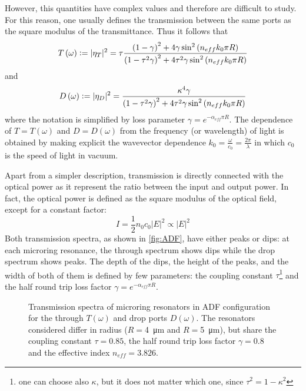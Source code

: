 However, this quantities have complex values and therefore are difficult to study.
For this reason, one usually defines the transmission between the same ports as the square modulus of the transmittance.
Thus it follows that
\begin{equation}
T \left( \omega \right) \vcentcolon= |\eta_T|^2 = \tau 
\dfrac	{ \left( 1- 				\gamma \right)^2 + 4 				\gamma \sin^2 \left( n_{eff} k_0 \pi R \right) }
			{ \left( 1-\tau^2	\gamma \right)^2 + 4 \tau^2	\gamma \sin^2 \left( n_{eff} k_0 \pi R \right) }
\end{equation}
and
\begin{equation}
D \left( \omega \right) \vcentcolon= |\eta_D|^2 =
\dfrac	{ \kappa^4 \gamma}
			{ \left( 1-\tau^2	\gamma \right)^2 + 4 \tau^2	\gamma \sin^2 \left( n_{eff} k_0 \pi R \right) }
\end{equation}
where the notation is simplified by loss parameter $\gamma = e^{-\alpha_{eff}\pi R}$.
The dependence of $T=T(\omega)$ and $D=D(\omega)$ from the frequency (or wavelength) of light is obtained by making explicit the wavevector dependence $k_0=\frac{\omega}{c_0}=\frac{2\pi}{\lambda}$ in which $c_0$ is the speed of light in vacuum.

Apart from a simpler description, transmission is directly connected with the optical power as it represent the ratio between the input and output power.
In fact, the optical power is defined as the square modulus of the optical field, except for a constant factor:
$$ I = \frac{1}{2}n_0c_0|E|^2 \propto |E|^2$$
Both transmission spectra, as shown in \autoref{fig:ADF}, have either peaks or dips: at each microring resonance, the through spectrum shows dips while the drop spectrum shows peaks.
The depth of the dips, the height of the peaks, and the width of both of them is defined by few parameters: the coupling constant $\tau$\footnote{one can choose also $\kappa$, but it does not matter which one, since $\tau^2 = 1-\kappa^2$} and the half round trip loss factor $\gamma = e^{-\alpha_{eff}\pi R}$.

\begin{figure}[htbp]
	\centering
	
	\caption{
		Transmission spectra of microring resonators in ADF configuration for the through $T(\omega)$ and drop ports $D(\omega)$.
		The resonators considered differ in radius ($R=$\SI{4}{\um} and $R=$\SI{5}{\um}), but share the coupling constant $\tau=0.85$, the half round trip loss factor $\gamma=0.8$ and the effective index $n_{eff}=3.826$.
	}
	\label{fig:ADF}
\end{figure}

